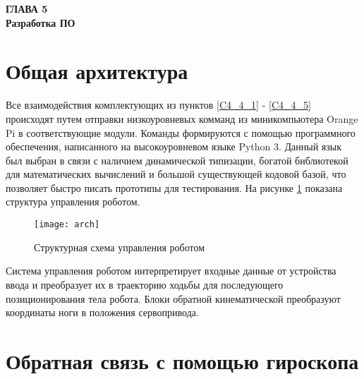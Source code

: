 \newpage
\begin{center}
	\textbf{\large ГЛАВА 5 \\ Разработка ПО}
\end{center}


\section{Общая архитектура}\label{C5_1}

Все взаимодействия комплектующих из пунктов \ref{C4_4_1} - \ref{C4_4_5} происходят путем отправки низкоуровневых комманд из миникомпьютера Orange Pi в соответствующие модули. Команды формируются с помощью программного обеспечения, написанного на высокоуровневом языке Python 3. Данный язык был выбран в связи с наличием динамической типизации, богатой библиотекой для математических вычислений и большой существующей кодовой базой, что позволяет быстро писать прототипы для тестирования. На рисунке \ref{arch} показана структура управления роботом.

\begin{figure}[h!]
	\begin{center}
		\texttt{[image: arch]}
		\caption{Структурная схема управления роботом}
		\label{arch}
	\end{center}
\end{figure}

Система управления роботом интерпретирует входные данные от устройства ввода и преобразует их в траекторию ходьбы для последующего позиционирования тела робота. Блоки обратной кинематической преобразуют координаты ноги в положения сервопривода.

\section{Обратная связь с помощью гироскопа}\label{C5_2}

